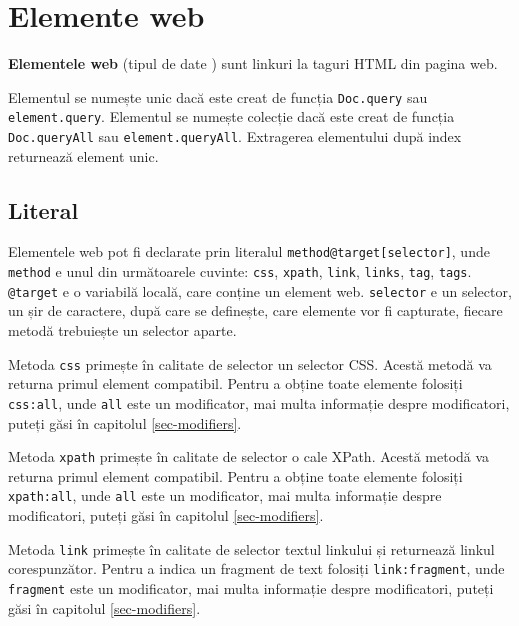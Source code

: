 \section{Elemente web}
\label{webelments}

{\bf Elementele web} (tipul de date \element) sunt linkuri la taguri HTML din pagina web.

Elementul se numește unic dacă este creat de funcția \texttt{Doc.query} sau \texttt{element.query}. Elementul se numește colecție dacă este creat de funcția \texttt{Doc.queryAll} sau \texttt{element.queryAll}. Extragerea elementului după index returnează element unic. 

\subsection{Literal}

Elementele web pot fi declarate prin literalul \texttt{method@target[selector]}, unde \texttt{method} e unul din următoarele cuvinte: \texttt{css}, \texttt{xpath}, \texttt{link}, \texttt{links}, \texttt{tag}, \texttt{tags}. \texttt{@target} e o variabilă locală, care conține un element web. \texttt{selector} e un selector, un șir de caractere, după care se definește, care elemente vor fi capturate, fiecare metodă trebuiește un selector aparte.

Metoda \texttt{css} primește în calitate de selector un selector CSS. Acestă metodă va returna primul element compatibil. Pentru a obține toate elemente folosiți \texttt{css:all}, unde \texttt{all} este un modificator, mai multa informație despre modificatori, puteți găsi în capitolul \ref{sec-modifiers}.

Metoda \texttt{xpath} primește în calitate de selector o cale XPath. Acestă metodă va returna primul element compatibil. Pentru a obține toate elemente folosiți \texttt{xpath:all}, unde \texttt{all} este un modificator, mai multa informație despre modificatori, puteți găsi în capitolul \ref{sec-modifiers}.

Metoda \texttt{link} primește în calitate de selector textul linkului și returnează linkul corespunzător. Pentru a indica un fragment de text folosiți \texttt{link:fragment}, unde \texttt{fragment} este un modificator, mai multa informație despre modificatori, puteți găsi în capitolul \ref{sec-modifiers}.

